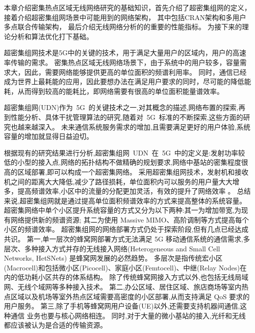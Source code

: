 

本章介绍密集热点区域无线网络研究的基础知识，首先介绍了超密集组网的定义，
接着介绍超密集组网场景中可能用到的网络架构，
其中包括CRAN架构和多用户多点联合传输架构，
最后介绍无线网络分析的的重要的性能指标。
为接下来的理论分析和算法优化打下基础。


超密集组网技术是5G中的关键的技术，用于满足大量用户的区域内，用户的高速率传输的需求。
密集热点区域无线网络场景下，由于系统中的用户较多，容量需求大，因此，需要网络能够提供更高的单位面积的频谱利用率。
同时，通信已经成为世界上最耗能的应用，因此要想办法在满足用户要求的同时，尽可能的降低能耗，从而得到较高的能耗比，即网络需要有很高的单位面积能量谱效率。

超密集组网(UDN)作为~5G~的关键技术之一,对其概念的描述,网络布置的探索,再到性能分析、具体干扰管理算法的研究,随着对~5G~标准的不断探索,这些方面的研究也越来越深入。
未来通信系统服务需求的增加,且需要满足更好的用户体验,系统容量的增加就显得日益迫切。

根据现有的研究结果进行分析,超密集组网~UDN~在~5G~中的定义是:发射功率较低的小型的接入点,网络的拓扑结构不做精确的规划要求,网络中基站的密集程度很高的区域部署,即可以构成一个超密集网络。
采用超密集组网技术，发射机和接收机之间的距离大大降低,减少了路径损耗，单位面积内可以服务的用户量大大增多，提高频谱效率,小区中的流量的分配更加灵活，有效的提升了网络效率 。
总结来说,超密集组网就是通过提高单位面积频谱效率的方式来提高整体的系统容量。
超密集网络中单个小区提升系统容量的方式又分为以下两种:其一为增加带宽,为现有网络提供新的频谱资源;
其二为使用 Massive MIMO、高阶调制等方式提高每个小区的频谱效率。
超密集组网的网络部署方式仍处于探索阶段,但有几点已经达成共识。
第一,单一层次的蜂窝网部署方式无法满足 5G 移动通信系统的通信需求,多层次、多种接入方式并存的无线接入网络(Heterogeneous and Small Cell Networks, HetSNets)
是蜂窝网发展的必然趋势。
多层次是指传统宏小区(Macrocell)和包括微小区(Picocell)、家庭小区(Femtocell)、中继(Relay Nodes)在内的低功耗小区共存的体系结构。
除了传统蜂窝网接入方式以外,也包括无线局域网、无线个域网等多种接入技术。
第二,办公区域、居住区域、旅店商场等室内热点区域以及机场等室外热点区域需要高密度的小区部署,从而支持满足 QoS 要求的用户服务。
第三,除了手机等蜂窝网用户设备(UE)以外,还需要支持机器间通信,这种通信
业务也要与核心网络相连。
同时,对于大量的微小基站的接入,光纤和无线都应该被认为是合适的传输资源。

